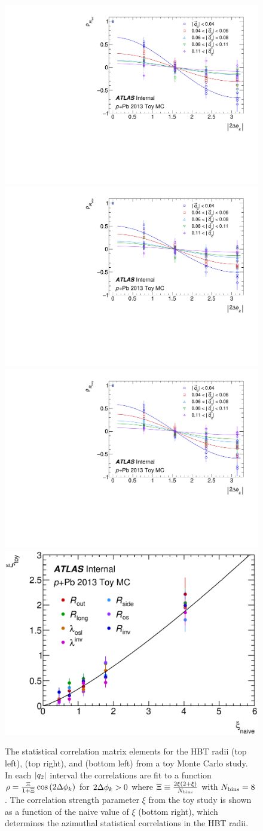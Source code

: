 \begin{figure}[h]
\centering
\includegraphics[width=.49\linewidth]{can_rho_Rout_dphi.pdf}
\includegraphics[width=.49\linewidth]{can_rho_Rside_dphi.pdf}
\includegraphics[width=.49\linewidth]{can_rho_Rlong_dphi.pdf}
\includegraphics[width=.49\linewidth]{xi_comparison.eps}
\caption{The statistical correlation matrix elements for the HBT radii \Rout (top left), \Rside (top right), and \Rlong (bottom left) from a toy Monte Carlo study. In each $|q_{2}|$ interval the correlations are fit to a function $\rho = \frac{\Xi}{1+\Xi} \cos\left(2\Delta\phi_{k}\right)$ for $2\Delta\phi_{k} > 0$ where $\Xi \equiv \frac{2\xi(2+\xi)}{N_\textrm{bins}}$ with $N_\textrm{bins} = 8$. The correlation strength parameter $\xi$ from the toy study is shown as a function of the naive value of $\xi$ (bottom right), which determines the azimuthal statistical correlations in the HBT radii.}
\label{fig:rho_dphi}
\end{figure}

